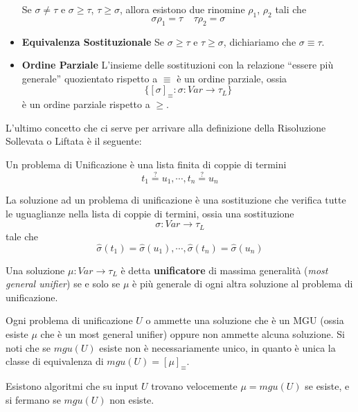 \begin{itemize}
                Se $\sigma \neq \tau$ e $\sigma \geq \tau$, $\tau \geq \sigma$, 
                allora esistono due rinomine $\rho_1$, $\rho_2$ tali che 
                $$
                \sigma\rho_1 = \tau ~~~~~ \tau\rho_2 = \sigma
                $$
        \item{\textbf{Equivalenza Sostituzionale}} Se $\sigma \geq \tau$ e $\tau \geq \sigma$, dichiariamo 
                che $\sigma \equiv \tau$.

        \item{\textbf{Ordine Parziale}} L'insieme delle sostituzioni con la relazione 
                ``essere più generale'' quozientato rispetto a $\equiv$ è 
                un ordine parziale, 
                ossia 
                $$
                \{[\sigma]_{\equiv}: \sigma : Var \rightarrow \tau_L\} 
                $$
                è un ordine parziale rispetto a $\geq$.
\end{itemize}

L'ultimo concetto che ci serve per arrivare alla definizione della Risoluzione 
Sollevata o Liftata è il seguente: 
\begin{defi}[Unificazione]
        Un problema di Unificazione è una lista finita di coppie di termini 
        $$
        t_1 \stackrel{?}{=} u_1, \cdots, t_n \stackrel{?}{=} u_n
        $$
\end{defi}
La soluzione ad un problema di unificazione è una sostituzione che verifica tutte 
le uguaglianze nella lista di coppie di termini, ossia una sostituzione 
$$
\sigma: Var \rightarrow \tau_L 
$$
tale che 
$$
\hat{\sigma}(t_1) = \hat{\sigma}(u_1), \cdots, \hat{\sigma}(t_n) = \hat{\sigma}(u_n)
$$
\begin{defi}[Unificatore]
        Una soluzione $\mu: Var \rightarrow \tau_L$ è detta \textbf{unificatore}
        di massima generalità (\textit{most general unifier}) se e solo se 
        $\mu$ è più generale di ogni altra soluzione al problema di unificazione.
\end{defi}

\begin{teo}[di Unificazione]
Ogni problema di unificazione $U$ o ammette una soluzione che è un MGU (ossia 
esiste $\mu$ che è un most general unifier) oppure non ammette alcuna soluzione. 
Si noti che se $mgu(U)$ esiste non è necessariamente unico, in quanto è unica 
la classe di equivalenza di $mgu(U) = [\mu]_{\equiv}$.

Esistono algoritmi che su 
input $U$ trovano velocemente $\mu = mgu(U)$ se esiste, e si fermano 
se $mgu(U)$ non esiste.

\end{teo}

